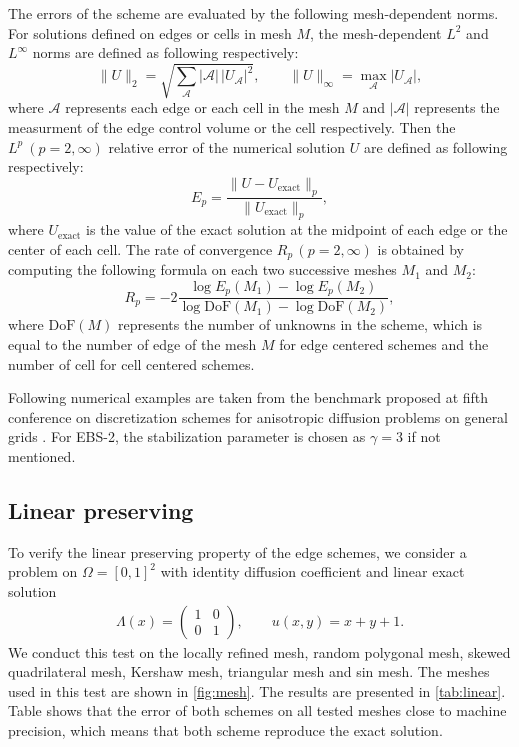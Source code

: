 \documentclass[times,review,preprint,authoryear]{elsarticle}
\begin{document}
The errors of the scheme are evaluated by the following mesh-dependent norms.
For solutions defined on edges or cells in mesh $M$, the mesh-dependent $L^2$ and $L^{\infty}$ norms are defined as following respectively:
\begin{equation}
\|U\|_{2} = \sqrt{ \sum_{\mathcal{A}} |\mathcal{A}| \, |U_{\mathcal{A}}|^2 }, \qquad \|U\|_{\infty} = \max_{\mathcal{A}} |U_{\mathcal{A}}|, 
\end{equation}
where $\mathcal{A}$ represents each edge or each cell in the mesh $M$ and $|\mathcal{A}|$ represents the measurment of the edge control volume or the cell respectively.
Then the $L^p \ (p = 2, \infty)$ relative error of the numerical solution $U$ are defined as following respectively:
\begin{equation}
E_{p} = \frac{\|U - U_{\text{exact}}\|_{p}}{\|U_{\text{exact}}\|_{p}},
\end{equation}
where $U_{\text{exact}}$ is the value of the exact solution at the midpoint of each edge or the center of each cell.
The rate of convergence $R_{p} \, (p = 2, \infty)$ is obtained by computing the following formula on each two successive meshes $M_1$ and $M_2$:
\begin{equation}
R_{p} = -2 \frac{\log E_{p}(M_1) - \log E_{p}(M_2)}{\log \text{DoF}(M_1) - \log \text{DoF}(M_2)},
\end{equation}
where $\text{DoF}(M)$ represents the number of unknowns in the scheme, which is equal to the number of edge of the mesh $M$ for edge centered schemes and the number of cell for cell centered schemes.

Following numerical examples are taken from the benchmark proposed at fifth conference on discretization schemes for anisotropic diffusion problems on general grids \cite{???}. For EBS-2, the stabilization parameter is chosen as $\gamma = 3$ if not mentioned.

\subsection{Linear preserving}

To verify the linear preserving property of the edge schemes, we consider a problem on $\Omega = [0,1]^2$ with identity diffusion coefficient and linear exact solution
\begin{align*}
\Lambda(x) =
\left(
\begin{matrix}
1 & 0 \\
0 & 1
\end{matrix}
\right),
\qquad
u(x,y) = x + y + 1.
\end{align*}
We conduct this test on the locally refined mesh, random polygonal mesh, skewed quadrilateral mesh, Kershaw mesh, triangular mesh and sin mesh. The meshes used in this test are shown in \cref{fig:mesh}. The results are presented in \cref{tab:linear}. Table shows that the error of both schemes on all tested meshes close to machine precision, which means that both scheme reproduce the exact solution.
\end{document}
